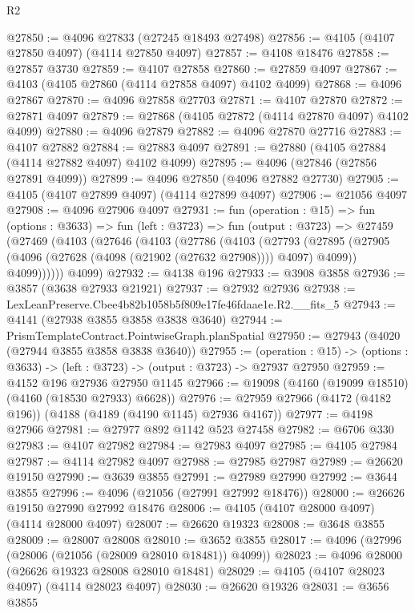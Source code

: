 \begin{lexlean}{R2}
\begin{coremodule}
@27850 := @4096 @27833 (@27245 @18493 @27498)
@27856 := @4105 (@4107 @27850 @4097) (@4114 @27850 @4097)
@27857 := @4108 @18476
@27858 := @27857 @3730
@27859 := @4107 @27858
@27860 := @27859 @4097
@27867 := @4103 (@4105 @27860 (@4114 @27858 @4097) @4102 @4099)
@27868 := @4096 @27867
@27870 := @4096 @27858 @27703
@27871 := @4107 @27870
@27872 := @27871 @4097
@27879 := @27868 (@4105 @27872 (@4114 @27870 @4097) @4102 @4099)
@27880 := @4096 @27879
@27882 := @4096 @27870 @27716
@27883 := @4107 @27882
@27884 := @27883 @4097
@27891 := @27880 (@4105 @27884 (@4114 @27882 @4097) @4102 @4099)
@27895 := @4096 (@27846 (@27856 @27891 @4099))
@27899 := @4096 @27850 (@4096 @27882 @27730)
@27905 := @4105 (@4107 @27899 @4097) (@4114 @27899 @4097)
@27906 := @21056 @4097
@27908 := @4096 @27906 @4097
@27931 := fun (operation : @15) =>
  fun (options : @3633) =>
  fun (left : @3723) =>
  fun (output : @3723) =>
  @27459
    (@27469
      (@4103
        (@27646
          (@4103
            (@27786
              (@4103
                (@27793
                  (@27895 (@27905 (@4096 (@27628 (@4098 (@21902 (@27632 @27908)))) @4097) @4099))
                  @4099))))))
      @4099)
@27932 := @4138 @196
@27933 := @3908 @3858
@27936 := @3857 (@3638 @27933 @21921)
@27937 := @27932 @27936
@27938 := LexLeanPreserve.Cbee4b82b1058b5f809e17fe46fdaae1e.R2.__fits_5
@27943 := @4141 (@27938 @3855 @3858 @3838 @3640)
@27944 := PrismTemplateContract.PointwiseGraph.planSpatial
@27950 := @27943 (@4020 (@27944 @3855 @3858 @3838 @3640))
@27955 := (operation : @15) ->
  (options : @3633) -> (left : @3723) -> (output : @3723) -> @27937 @27950
@27959 := @4152 @196 @27936 @27950 @1145
@27966 := @19098 (@4160 (@19099 @18510) (@4160 (@18530 @27933) @6628))
@27976 := @27959 @27966 (@4172 (@4182 @196)) (@4188 (@4189 (@4190 @1145) @27936 @4167))
@27977 := @4198 @27966
@27981 := @27977 @892 @1142 @523 @27458
@27982 := @6706 @330
@27983 := @4107 @27982
@27984 := @27983 @4097
@27985 := @4105 @27984
@27987 := @4114 @27982 @4097
@27988 := @27985 @27987
@27989 := @26620 @19150
@27990 := @3639 @3855
@27991 := @27989 @27990
@27992 := @3644 @3855
@27996 := @4096 (@21056 (@27991 @27992 @18476))
@28000 := @26626 @19150 @27990 @27992 @18476
@28006 := @4105 (@4107 @28000 @4097) (@4114 @28000 @4097)
@28007 := @26620 @19323
@28008 := @3648 @3855
@28009 := @28007 @28008
@28010 := @3652 @3855
@28017 := @4096 (@27996 (@28006 (@21056 (@28009 @28010 @18481)) @4099))
@28023 := @4096 @28000 (@26626 @19323 @28008 @28010 @18481)
@28029 := @4105 (@4107 @28023 @4097) (@4114 @28023 @4097)
@28030 := @26620 @19326
@28031 := @3656 @3855

\end{coremodule}
\end{lexlean}
